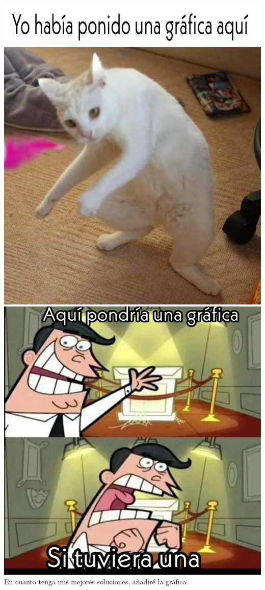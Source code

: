 \documentclass[
10pt,
a4paper,
oneside,
headinclude,footinclude,
BCOR5mm,
]{article}
\begin{document}
\includegraphics[scale=.2]{../imagenes/gatito.jpg}
\includegraphics[scale=.2]{../imagenes/pm.jpg}\\
En cuanto tenga mis mejores soluciones, añadiré la gráfica.
\end{document}
